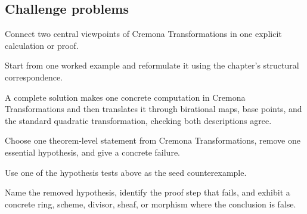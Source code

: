 \subsection*{Challenge problems}

\begin{exercise}\label{exr:vi44-expand-15}
Connect two central viewpoints of Cremona Transformations in one explicit calculation or proof.
\end{exercise}
\begin{hint}
Start from one worked example and reformulate it using the chapter's structural correspondence.
\end{hint}
\begin{solution}
A complete solution makes one concrete computation in Cremona Transformations and then translates it through birational maps, base points, and the standard quadratic transformation, checking both descriptions agree.
\end{solution}

\begin{exercise}\label{exr:vi44-expand-16}
Choose one theorem-level statement from Cremona Transformations, remove one essential hypothesis, and give a concrete failure.
\end{exercise}
\begin{hint}
Use one of the hypothesis tests above as the seed counterexample.
\end{hint}
\begin{solution}
Name the removed hypothesis, identify the proof step that fails, and exhibit a concrete ring, scheme, divisor, sheaf, or morphism where the conclusion is false.
\end{solution}

